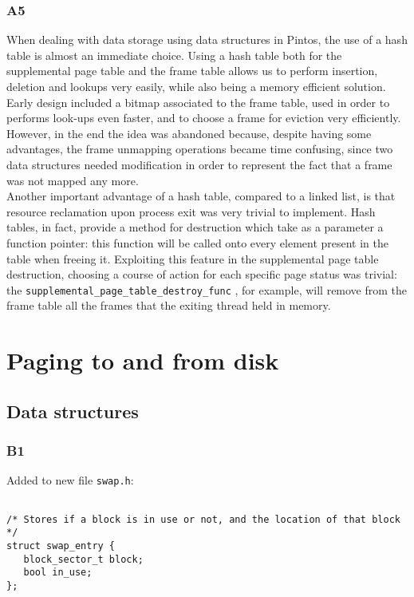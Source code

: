 \documentclass[a4wide, 11pt]{article}
\newcommand{\tx}{\texttt}
\begin{document}
\subsubsection{A5}
When dealing with data storage using data structures in Pintos, the use of a hash table is almost an immediate choice. Using a hash table both for the supplemental page table and the frame table allows us to perform insertion, deletion and lookups very easily, while also being a memory efficient solution. Early design included a bitmap associated to the frame table, used in order to performs look-ups even faster, and to choose a frame for eviction very efficiently. However, in the end the idea was abandoned because, despite having some advantages, the frame unmapping operations became time confusing, since two data structures needed modification in order to represent the fact that a frame was not mapped any more. \\
Another important advantage of a hash table, compared to a linked  list, is that resource reclamation upon process exit was very trivial to implement. Hash tables, in fact, provide a method for destruction which take as a parameter a function pointer: this function will be called onto every  element present in the table when freeing it. Exploiting this feature in the supplemental page table destruction, choosing a course of action for each specific page status was trivial: the \tx{supplemental\_page\_table\_destroy\_func} , for example, will remove from the frame table all the frames that the exiting thread held in memory.

\section{Paging to and from disk}

\subsection{Data structures}
\subsubsection{B1}

Added to new file \tx{swap.h}:
\begin{verbatim}

/* Stores if a block is in use or not, and the location of that block */
struct swap_entry {
   block_sector_t block;
   bool in_use;
};
\end{verbatim}
\end{document}
